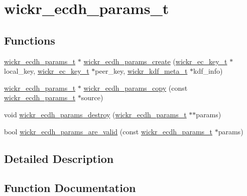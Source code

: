 \hypertarget{group__wickr__ecdh__params}{}\section{wickr\+\_\+ecdh\+\_\+params\+\_\+t}
\label{group__wickr__ecdh__params}
\subsection*{Functions}
\begin{DoxyCompactItemize}
\item 
\hyperlink{structwickr__ecdh__params}{wickr\+\_\+ecdh\+\_\+params\+\_\+t} $\ast$ \hyperlink{group__wickr__ecdh__params_ga8a5be72f13caa4bf5ee99e16cc3b092f}{wickr\+\_\+ecdh\+\_\+params\+\_\+create} (\hyperlink{structwickr__ec__key}{wickr\+\_\+ec\+\_\+key\+\_\+t} $\ast$local\+\_\+key, \hyperlink{structwickr__ec__key}{wickr\+\_\+ec\+\_\+key\+\_\+t} $\ast$peer\+\_\+key, \hyperlink{structwickr__kdf__meta}{wickr\+\_\+kdf\+\_\+meta\+\_\+t} $\ast$kdf\+\_\+info)
\item 
\hyperlink{structwickr__ecdh__params}{wickr\+\_\+ecdh\+\_\+params\+\_\+t} $\ast$ \hyperlink{group__wickr__ecdh__params_ga016f2b643f2636c05ed72bc08a0314f0}{wickr\+\_\+ecdh\+\_\+params\+\_\+copy} (const \hyperlink{structwickr__ecdh__params}{wickr\+\_\+ecdh\+\_\+params\+\_\+t} $\ast$source)
\item 
void \hyperlink{group__wickr__ecdh__params_gaf6efcaf58f603e323443063cde9b5621}{wickr\+\_\+ecdh\+\_\+params\+\_\+destroy} (\hyperlink{structwickr__ecdh__params}{wickr\+\_\+ecdh\+\_\+params\+\_\+t} $\ast$$\ast$params)
\item 
bool \hyperlink{group__wickr__ecdh__params_ga801f1bfae11ac0c94d59bf9dd58f78aa}{wickr\+\_\+ecdh\+\_\+params\+\_\+are\+\_\+valid} (const \hyperlink{structwickr__ecdh__params}{wickr\+\_\+ecdh\+\_\+params\+\_\+t} $\ast$params)
\end{DoxyCompactItemize}


\subsection{Detailed Description}


\subsection{Function Documentation}
\mbox{\label{group__wickr__ecdh__params_ga801f1bfae11ac0c94d59bf9dd58f78aa}} 
